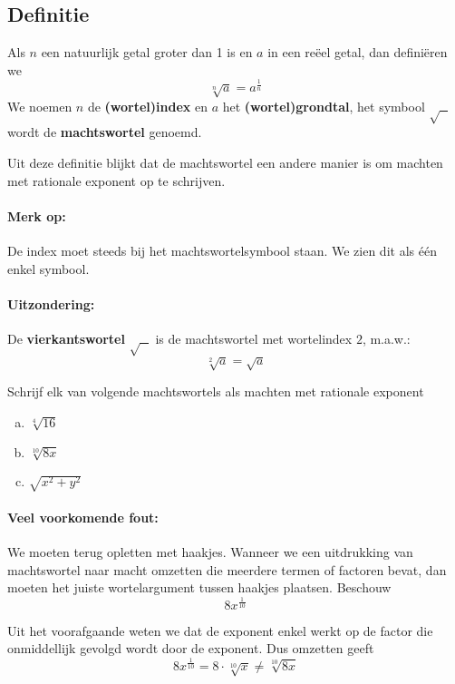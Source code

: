 \documentclass[12pt,twoside]{article}
\begin{document}
\subsection{Definitie}

\begin{mdframed}
  Als $n$ een natuurlijk getal groter dan 1 is en $a$ in een reëel getal, dan definiëren we
  \[\sqrt[n]{a} = {a^{\frac{1}{n}}}\]
  We noemen $n$ de \textbf{(wortel)index} en $a$ het \textbf{(wortel)grondtal}, het symbool $\sqrt{\mbox{ }}$ wordt de \textbf{machtswortel} genoemd.
\end{mdframed}

Uit deze definitie blijkt dat de machtswortel een andere manier is om machten met rationale exponent op te schrijven.

\paragraph*{Merk op:} De index moet steeds bij het machtswortelsymbool staan. We zien dit als één enkel symbool.

\paragraph*{Uitzondering:} De \textbf{vierkantswortel} $\sqrt{\mbox{ }}$ is de machtswortel met wortelindex $2$, m.a.w.:
\[\sqrt[2]{a} = \sqrt a \]

\begin{oefening}
  Schrijf elk van volgende machtswortels als machten met rationale exponent
  \begin{enumerate}[(a)]
    \itemsep1em
  \item \(\sqrt[4]{{16}}\)
  \item \(\sqrt[{10}]{{8x}}\)
  \item \(\sqrt {{x^2} + {y^2}} \)
\end{enumerate}
\end{oefening}

\paragraph*{Veel voorkomende fout:} We moeten terug opletten met haakjes. Wanneer we een uitdrukking van machtswortel naar macht omzetten die meerdere termen of factoren bevat, dan moeten het juiste wortelargument tussen haakjes plaatsen. Beschouw
\[8{x^{\frac{1}{{10}}}}\]

Uit het voorafgaande weten we dat de exponent enkel werkt op de factor die onmiddellijk gevolgd wordt door de exponent. Dus omzetten geeft
\[8{x^{\frac{1}{{10}}}} = 8\cdot\sqrt[{10}]{x} \ne \sqrt[{10}]{{8x}}\]
\end{document}

